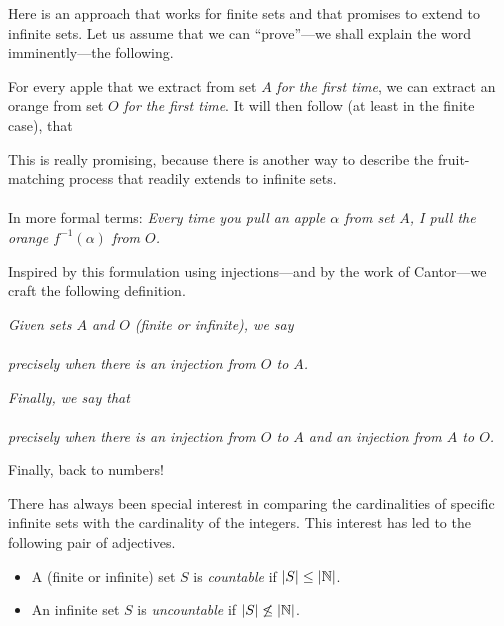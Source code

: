 \medskip

Here is an approach that works for finite sets and that promises to
extend to infinite sets.  Let us assume that we can ``prove''---we
shall explain the word imminently---the following.

For every apple that we extract from set $A$ {\em for the first time},
we can extract an orange from set $O$ {\em for the first time}.  It
will then follow (at least in the finite case), that \\
\hspace*{.35in}{\em There are at least as many oranges as apples!}

\noindent
This is really promising, because there is another way to describe the
fruit-matching process that readily extends to infinite sets.  \\
 \\
In more formal terms: {\em Every time you pull an apple $\alpha$ from set
  $A$, I pull the orange $f^{-1}(\alpha)$ from $O$.}

\medskip

Inspired by this formulation using injections---and by the work of
Cantor---we craft the following definition.

\noindent
{\em
Given sets $A$ and $O$ (finite or infinite), we say \\
\hspace*{.35in}{\em Set $O$ is at least as big as set $A$, denoted
  $|O| \geq |A|$} \\
precisely when there is an injection from $O$ to $A$.}

\noindent
{\em
Finally, we say that \\
\hspace*{.35in}{\em Sets $O$ and $A$ have the same cardinality,
  denoted $|O| = |A|$} \\
precisely when there is an injection from $O$ to $A$ {\em and} an
injection from $A$ to $O$.}

\medskip

Finally, back to numbers!

There has always been special interest in comparing the cardinalities of
specific infinite sets with the cardinality of the integers.  This
interest has led to the following pair of adjectives.
\begin{itemize}
\item
A (finite or infinite) set $S$ is {\it countable}   if $|S| \leq |\mathbb{N}|$.
\item
An infinite set $S$ is {\it uncountable} 
 if $|S| \not\leq |\mathbb{N}|$.
\end{itemize}

